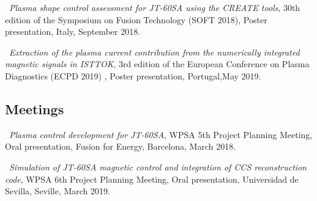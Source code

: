 \textbullet \, \textit{Plasma shape control assessment for JT-60SA using the CREATE tools}, 30th edition of the Symposium on Fusion Technology (SOFT 2018), Poster presentation, Italy, September 2018. 
\smallskip

\textbullet \, \textit{Extraction of the plasma current contribution from the numerically integrated magnetic signals in ISTTOK}, 3rd edition of the European Conference on Plasma Diagnostics (ECPD 2019) , Poster presentation, Portugal,May 2019.

\subsection{Meetings}

\textbullet \, \textit{Plasma control development for JT-60SA}, WPSA 5th Project Planning Meeting, Oral presentation, Fusion for Energy, Barcelona, March 2018. 
\smallskip

\textbullet \, \textit{Simulation of JT-60SA magnetic control and integration of CCS reconstruction	code}, WPSA 6th Project Planning Meeting, Oral presentation, Universidad de Sevilla, Seville, March 2019. 



\vfill